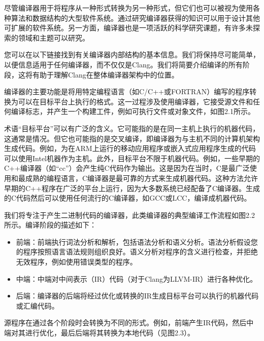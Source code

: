 尽管编译器用于将程序从一种形式转换为另一种形式，但它们也可以被视为使用各种算法和数据结构的大型软件系统。通过研究编译器获得的知识可以用于设计其他可扩展的软件系统。另一方面，编译器也是一项活跃的科学研究课题，有许多未探索的领域和主题可以研究。

您可以在以下链接找到有关编译器内部结构的基本信息。我们将保持尽可能简单，以便信息适用于任何编译器，而不仅仅是Clang。我们将简要介绍编译的所有阶段，这将有助于理解Clang在整体编译器架构中的位置。


编译器的主要功能是将用特定编程语言（如C/C++或FORTRAN）编写的程序转换为可以在目标平台上执行的格式。这一过程涉及使用编译器，它接受源文件和任何编译标志，并产生一个构建工件，例如可执行文件或对象文件，如图2.1所示。


术语“目标平台”可以有广泛的含义。它可能指的是在同一主机上执行的机器代码，这通常是情况。但它也可能指的是交叉编译，即编译器为与主机不同的计算机架构生成代码。例如，为在ARM上运行的移动应用程序或嵌入式应用程序生成的代码可以使用Intel机器作为主机。此外，目标平台不限于机器代码。例如，一些早期的C++编译器（如“cc”）会产生纯C代码作为输出。这是因为在当时，C是最广泛使用和最成熟的编程语言，C编译器是最可靠的方式来生成机器代码。这种方法允许早期的C++程序在广泛的平台上运行，因为大多数系统已经配备了C编译器。生成的C代码然后可以使用任何流行的C编译器，如GCC或LCC，编译成机器代码。


我们将专注于产生二进制代码的编译器，此类编译器的典型编译工作流程如图2.2所示。编译阶段的描述如下：

\begin{itemize}
\item
前端：前端执行词法分析和解析，包括语法分析和语义分析。语法分析假设您的程序按照语言语法规则组织良好。语义分析对程序的含义进行检查，并拒绝无效程序，例如使用错误类型的程序。

\item
中端：中端对中间表示（IR）代码（对于Clang为LLVM-IR）进行各种优化。

\item
后端：编译器的后端将经过优化或转换的IR生成目标平台可以执行的机器代码或汇编代码。
\end{itemize}

源程序在通过各个阶段时会转换为不同的形式。例如，前端产生IR代码，然后中端对其进行优化，最后后端将其转换为本地代码（见图2.3）。

